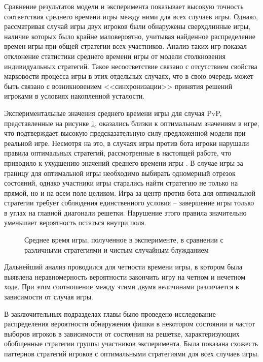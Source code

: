 Сравнение результатов модели и эксперимента показывает высокую точность соответствия среднего времени игры между ними для всех случаев игры. Однако, рассматривая случай игры двух игроков были обнаружены сверхдлинные игры, наличие которых было крайне маловероятно, учитывая найденное распределение времен игры при общей стратегии всех участников. Анализ таких игр показал отклонение статистики среднего времени игры от модели столкновения индивидуальных стратегий. Такое несоответствие связано с отсутствием свойства марковости процесса игры в этих отдельных случаях, что в свою очередь может быть связано с возникновением <<синхронизации>> принятия решений игроками в условиях накопленной усталости.

Экспериментальные значения среднего времени игры для случая PvP, представленные на рисунке \cref{fig:mean-times}, оказались близки к оптимальным значениям в игре, что подтверждает высокую предсказательную силу предложенной модели при реальной игре. Несмотря на это, в случаях игры против бота игроки нарушали правила оптимальных стратегий, рассмотренные в настоящей работе, что приводило к ухудшению значений среднего времени игры \cite{confbib4}. В случае игры за границу для оптимальной игры необходимо выбирать одномерный отрезок состояний, однако участники игры старались найти стратегию не только на прямой, но и на всем поле целиком. Игра за центр против бота для оптимальной стратегии требует соблюдения единственного условия -- завершение игры только в углах на главной диагонали решетки. Нарушение этого правила значительно уменьшает вероятность остаться внутри поля. 

\begin{figure}[ht]
    \caption{
        Среднее время игры, полученное в эксперименте, в сравнении с различными стратегиями и чистым случайным блужданием
    }  
    \label{fig:mean-times}
\end{figure}

Дальнейший анализ проводился для четности времени игры, в котором была выявлена неравномерность вероятности закончить игру на четном и нечетном ходе. При этом соотношение между этими двумя величинами различается в зависимости от случая игры. 

В заключительных подразделах главы было проведено исследование распределения вероятности обнаружения фишки в некотором состоянии и частот выборов игроков в зависимости от состояния на решетке, характеризующих обобщенные стратегии группы участников эксперимента. Была показана схожесть паттернов стратегий игроков с оптимальными стратегиями для всех случаев игры.

